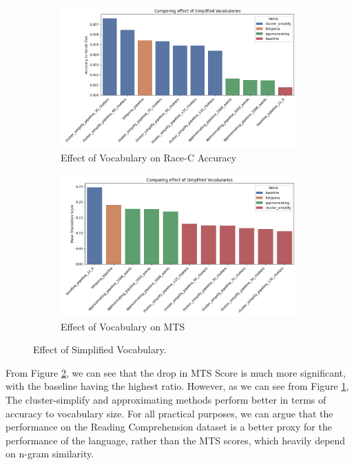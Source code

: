 \begin{figure}[H]
    \centering
    \begin{subfigure}[b]{0.48\linewidth}
        \includegraphics[width=\linewidth]{figures/results/1_effect_of_vocab_simplify.png}
        \caption{Effect of Vocabulary on Race-C Accuracy}
        \label{fig:vocabulary-effect-rc}
    \end{subfigure}
    \hfill
    \begin{subfigure}[b]{0.48\textwidth}
        \includegraphics[width=\linewidth]{figures/results/1_effect_of_vocab_simplify_mts.png}
        \caption{Effect of Vocabulary on MTS}
        \label{fig:vocabulary-effect-mts}
    \end{subfigure}
    \caption{Effect of Simplified Vocabulary.}
    \label{fig:vocabulary-effect-mts-rc}
\end{figure}

From Figure \ref{fig:vocabulary-effect-mts}, we can see that the drop in MTS Score is much more significant, with the baseline having the highest ratio. However,
as we can see from Figure \ref{fig:vocabulary-effect-rc}, The cluster-simplify and approximating methods perform better in terms of accuracy to vocabulary size.
For all practical purposes, we can argue that the performance on the Reading Comprehension dataset is a better proxy for the performance of the language, rather than the MTS scores,
which heavily depend on n-gram similarity.

